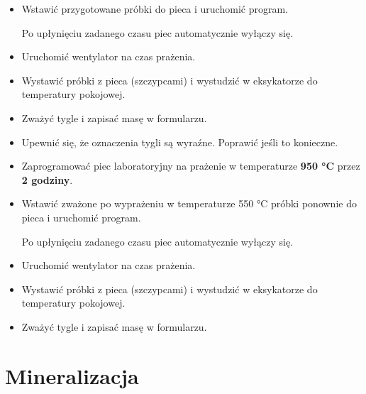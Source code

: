 \documentclass[
  letterpaper,
  DIV=11,
  numbers=noendperiod]{scrreprt}
\begin{document}
\begin{itemize}
\item
  Wstawić przygotowane próbki do pieca i uruchomić program.

  Po upłynięciu zadanego czasu piec automatycznie wyłączy się.
\item
  Uruchomić wentylator na czas prażenia.
\item
  Wystawić próbki z pieca (szczypcami) i wystudzić w eksykatorze do
  temperatury pokojowej.
\item
  Zważyć tygle i zapisać masę w formularzu.
\item
  Upewnić się, że oznaczenia tygli są wyraźne. Poprawić jeśli to
  konieczne.
\item
  Zaprogramować piec laboratoryjny na prażenie w temperaturze
  \textbf{950 °C} przez \textbf{2 godziny}.
\item
  Wstawić zważone po wyprażeniu w temperaturze 550 °C próbki ponownie do
  pieca i uruchomić program.

  Po upłynięciu zadanego czasu piec automatycznie wyłączy się.
\item
  Uruchomić wentylator na czas prażenia.
\item
  Wystawić próbki z pieca (szczypcami) i wystudzić w eksykatorze do
  temperatury pokojowej.
\item
  Zważyć tygle i zapisać masę w formularzu.
\end{itemize}

\hypertarget{mineralizacja}{%
\section{Mineralizacja}\label{mineralizacja}}
\end{document}
